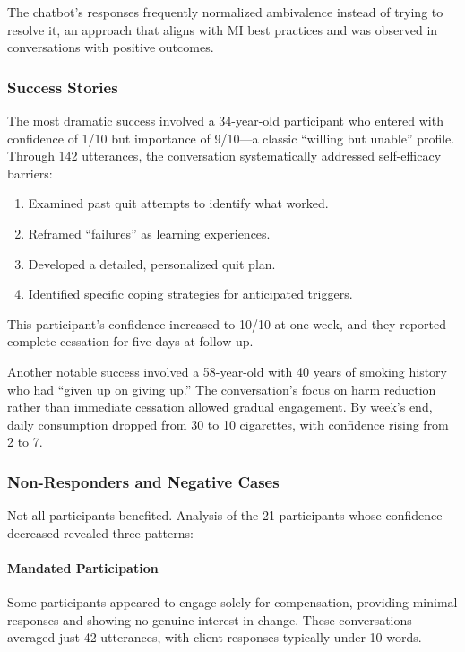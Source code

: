 The chatbot's responses frequently normalized ambivalence instead of trying to resolve it, an approach that aligns with MI best practices and was observed in conversations with positive outcomes.

\subsubsection*{Success Stories}

The most dramatic success involved a 34-year-old participant who entered with confidence of 1/10 but importance of 9/10---a classic ``willing but unable'' profile. Through 142 utterances, the conversation systematically addressed self-efficacy barriers:

\begin{enumerate}
	\item Examined past quit attempts to identify what worked.
	\item Reframed ``failures'' as learning experiences.
	\item Developed a detailed, personalized quit plan.
	\item Identified specific coping strategies for anticipated triggers.
\end{enumerate}

This participant's confidence increased to 10/10 at one week, and they reported complete cessation for five days at follow-up.

Another notable success involved a 58-year-old with 40 years of smoking history who had ``given up on giving up.'' The conversation's focus on harm reduction rather than immediate cessation allowed gradual engagement. By week's end, daily consumption dropped from 30 to 10 cigarettes, with confidence rising from 2 to 7.

\subsubsection{Non-Responders and Negative Cases}

Not all participants benefited. Analysis of the 21 participants whose confidence decreased revealed three patterns:

\paragraph{Mandated Participation}
Some participants appeared to engage solely for compensation, providing minimal responses and showing no genuine interest in change. These conversations averaged just 42 utterances, with client responses typically under 10 words.

